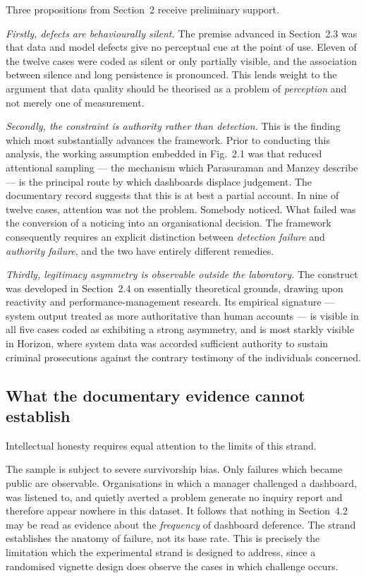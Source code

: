 \documentclass[11pt,a4paper]{article}
\numberwithin{figure}{section}
\numberwithin{table}{section}
\newcommand{\xref}[1]{\textcolor{citeblue}{#1}}         %
\begin{document}
Three propositions from \xref{Section~2} receive preliminary support.

\emph{Firstly, defects are behaviourally silent.} The premise advanced in \xref{Section~2.3} was
that data and model defects give no perceptual cue at the point of use. Eleven of the twelve cases
were coded as silent or only partially visible, and the association between silence and long
persistence is pronounced. This lends weight to the argument that data quality should be theorised
as a problem of \emph{perception} and not merely one of measurement.

\emph{Secondly, the constraint is authority rather than detection.} This is the finding which most
substantially advances the framework. Prior to conducting this analysis, the working assumption
embedded in \xref{Fig.~2.1} was that reduced attentional sampling --- the mechanism which
Parasuraman and Manzey describe --- is the principal route by which dashboards displace judgement.
The documentary record suggests that this is at best a partial account. In nine of twelve cases,
attention was not the problem. Somebody noticed. What failed was the conversion of a noticing into
an organisational decision. The framework consequently requires an explicit distinction between
\emph{detection failure} and \emph{authority failure}, and the two have entirely different remedies.

\emph{Thirdly, legitimacy asymmetry is observable outside the laboratory.} The construct was
developed in \xref{Section~2.4} on essentially theoretical grounds, drawing upon reactivity and
performance-management research. Its empirical signature --- system output treated as more
authoritative than human accounts --- is visible in all five cases coded as exhibiting a strong
asymmetry, and is most starkly visible in Horizon, where system data was accorded sufficient
authority to sustain criminal prosecutions against the contrary testimony of the individuals
concerned.

\subsection{What the documentary evidence cannot establish}

Intellectual honesty requires equal attention to the limits of this strand.

The sample is subject to severe survivorship bias. Only failures which became public are
observable. Organisations in which a manager challenged a dashboard, was listened to, and quietly
averted a problem generate no inquiry report and therefore appear nowhere in this dataset. It
follows that nothing in \xref{Section~4.2} may be read as evidence about the \emph{frequency} of
dashboard deference. The strand establishes the anatomy of failure, not its base rate. This is
precisely the limitation which the experimental strand is designed to address, since a randomised
vignette design does observe the cases in which challenge occurs.
\end{document}
